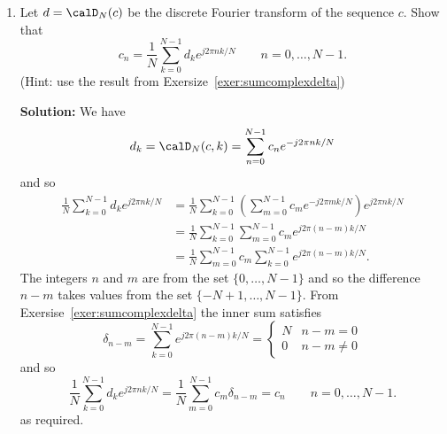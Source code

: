 \documentclass[11pt,a4paper]{book}
\theoremstyle{plain}
\numberwithin{equation}{section}
\newcommand{\ints}{{\mathbb Z}}
\newenvironment{solution}{\begin{footnotesize}\textbf{Solution:}}{\end{footnotesize}}
\newenvironment{excersizelist}{%
  \renewcommand*{\theenumi}{\thechapter.\arabic{enumi}}%
  \newcommand\itemadvanced{\stepcounter{enumi}\item[$\ast$\, \theenumi.]}
  \begin{enumerate}
}{%
  \end{enumerate}
}
\begin{document}
\begin{excersizelist}
\item \label{exer:inversedft} Let $d = \calD_N(c)$ be the discrete Fourier transform of the sequence $c$.  Show that
\[
c_n = \frac{1}{N}\sum_{k = 0}^{N-1} d_k e^{j 2\pi n k / N} \qquad n = 0, \dots, N-1.
\]
(Hint: use the result from Exersize~\ref{exer:sumcomplexdelta})
\begin{solution}
We have
\[
d_k = \calD_N(c,k) = \sum_{n = 0}^{N-1} c_n e^{-j 2\pi n k / N}
\]
and so
\begin{align*}
\frac{1}{N}\sum_{k = 0}^{N-1} d_k e^{j 2\pi n k / N} &= \frac{1}{N}\sum_{k = 0}^{N-1} \left( \sum_{m = 0}^{N-1} c_m e^{-j 2\pi m k / N} \right) e^{j 2\pi n k / N} \\
&= \frac{1}{N}\sum_{k = 0}^{N-1} \sum_{m = 0}^{N-1} c_m e^{j 2\pi (n-m) k / N} \\
&=  \frac{1}{N} \sum_{m = 0}^{N-1} c_m \sum_{k = 0}^{N-1} e^{j 2\pi (n-m) k / N}.
\end{align*}
The integers $n$ and $m$ are from the set $\{0,\dots,N-1\}$ and so the difference $n-m$ takes values from the set $\{-N+1,\dots,N-1\}$.  From Exersise~\ref{exer:sumcomplexdelta} the inner sum satisfies
\[
\delta_{n-m} = \sum_{k = 0}^{N-1} e^{j 2\pi (n-m) k / N} = \begin{cases}
N & n - m = 0 \\
0 & n-m \neq 0
\end{cases}
\]
and so
\[
\frac{1}{N}\sum_{k = 0}^{N-1} d_k e^{j 2\pi n k / N} = \frac{1}{N} \sum_{m = 0}^{N-1} c_m \delta_{n-m} = c_n \qquad n = 0, \dots, N-1.
\]
as required.

\end{solution}




\end{excersizelist}





\end{document}
